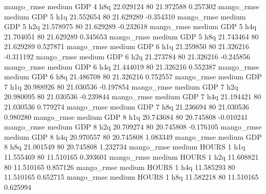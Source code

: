        mango_rmse     medium      GDP                 4                  h8q 22.029124 80      21.972588           0.257302
       mango_rmse     medium      GDP                 5                  h1q 21.552654 80      21.629289          -0.354310
       mango_rmse     medium      GDP                 5                  h2q 21.578975 80      21.629289          -0.232618
       mango_rmse     medium      GDP                 5                  h4q 21.704051 80      21.629289           0.345653
       mango_rmse     medium      GDP                 5                  h8q 21.743464 80      21.629289           0.527871
       mango_rmse     medium      GDP                 6                  h1q 21.259850 80      21.326216          -0.311192
       mango_rmse     medium      GDP                 6                  h2q 21.273784 80      21.326216          -0.245856
       mango_rmse     medium      GDP                 6                  h4q 21.444019 80      21.326216           0.552387
       mango_rmse     medium      GDP                 6                  h8q 21.486708 80      21.326216           0.752557
       mango_rmse     medium      GDP                 7                  h1q 20.988926 80      21.030536          -0.197854
       mango_rmse     medium      GDP                 7                  h2q 20.980095 80      21.030536          -0.239844
       mango_rmse     medium      GDP                 7                  h4q 21.194421 80      21.030536           0.779274
       mango_rmse     medium      GDP                 7                  h8q 21.236694 80      21.030536           0.980280
       mango_rmse     medium      GDP                 8                  h1q 20.743684 80      20.745808          -0.010241
       mango_rmse     medium      GDP                 8                  h2q 20.709274 80      20.745808          -0.176105
       mango_rmse     medium      GDP                 8                  h4q 20.970557 80      20.745808           1.083349
       mango_rmse     medium      GDP                 8                  h8q 21.001549 80      20.745808           1.232734
       mango_rmse     medium    HOURS                 1                  h1q 11.555469 80      11.510165           0.393601
       mango_rmse     medium    HOURS                 1                  h2q 11.608821 80      11.510165           0.857126
       mango_rmse     medium    HOURS                 1                  h4q 11.585293 80      11.510165           0.652715
       mango_rmse     medium    HOURS                 1                  h8q 11.582218 80      11.510165           0.625994
